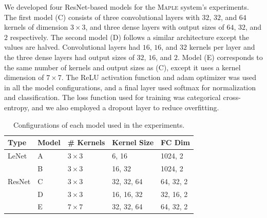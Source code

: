 We developed four ResNet-based models for the \textsc{Maple} system's experiments. The first model (C) consists of three convolutional layers with $32$, $32$, and $64$ kernels of dimension $3\times3$, and three dense layers with output sizes of $64$, $32$, and $2$ respectively. The second model (D) follows a similar architecture except the values are halved. Convolutional layers had $16$, $16$, and $32$ kernels per layer and the three dense layers had output sizes of $32$, $16$, and $2$. Model (E) corresponds to the same number of kernels and output sizes as (C), except it uses a kernel dimension of $7\times7$. The ReLU activation function and adam optimizer was used in all the model configurations, and a final layer used softmax for normalization and classification. The loss function used for training was categorical cross-entropy, and we also employed a dropout layer to reduce overfitting.

\begin{table} [h!]
\centering
\begin{tabular}{| l | l | l | l | l |}
\hline
Type & Model & \# Kernels & Kernel Size & FC Dim \\
\hline
LeNet & A & $3\times3$ & 6, 16 & 1024, 2 \\
\cline{2-5}
& B & $3\times3$ & 16, 32 & 1024, 2 \\
\hline
ResNet & C & $3\times3$ & 32, 32, 64 & 64, 32, 2 \\
\cline{2-5}
& D & $3\times3$ & 16, 16, 32 & 32, 16, 2 \\
\cline{2-5}
& E & $7\times7$ & 32, 32, 64 & 64, 32, 2 \\
\cline{2-5}
\hline
\end{tabular}
\caption{Configurations of each model used in the experiments.}
\label{table:attacks}
\end{table}
